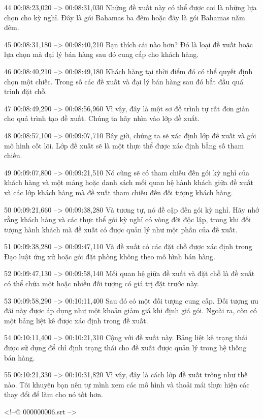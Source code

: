 44
00:08:23,020 --> 00:08:31,030
Những đề xuất này có thể được coi là những lựa chọn cho kỳ nghỉ.  Đây là gói Bahamas ba đêm hoặc đây là gói Bahamas năm đêm.

45
00:08:31,180 --> 00:08:40,210
Bạn thích cái nào hơn?  Đó là loại đề xuất hoặc lựa chọn mà đại lý bán hàng sau đó cung cấp cho khách hàng.

46
00:08:40,210 --> 00:08:49,180
Khách hàng tại thời điểm đó có thể quyết định chọn một chiếc.  Trong số các đề xuất và đại lý bán hàng sau đó bắt đầu quá trình đặt chỗ.

47
00:08:49,290 --> 00:08:56,960
Vì vậy, đây là một sơ đồ trình tự rất đơn giản cho quá trình tạo đề xuất.  Chúng ta hãy nhìn vào lớp đề xuất.

48
00:08:57,100 --> 00:09:07,710
Bây giờ, chúng ta sẽ xác định lớp đề xuất và gói mô hình cốt lõi.  Lớp đề xuất sẽ là một thực thể được xác định bằng số tham chiếu.

49
00:09:07,800 --> 00:09:21,510
Nó cũng sẽ có tham chiếu đến gói kỳ nghỉ của khách hàng và một mảng hoặc danh sách mối quan hệ hành khách giữa đề xuất và các lớp khách hàng mà đề xuất tham chiếu đến đối tượng khách hàng.

50
00:09:21,660 --> 00:09:38,280
Và tương tự, nó đề cập đến gói kỳ nghỉ.  Hãy nhớ rằng khách hàng và các thực thể gói kỳ nghỉ có vòng đời độc lập, trong khi đối tượng hành khách mà đề xuất có được quản lý như một phần của đề xuất.

51
00:09:38,280 --> 00:09:47,110
Và đề xuất có các đặt chỗ được xác định trong Đạo luật ứng xử hoặc gói đặt phòng không theo mô hình bán hàng.

52
00:09:47,130 --> 00:09:58,140
Mối quan hệ giữa đề xuất và đặt chỗ là đề xuất có thể chứa một hoặc nhiều đối tượng có giá trị đặt trước này.

53
00:09:58,290 --> 00:10:11,400
Sau đó có một đối tượng cung cấp.  Đối tượng ưu đãi này được áp dụng như một khoản giảm giá khi định giá gói.  Ngoài ra, còn có một bảng liệt kê được xác định trong đề xuất.

54
00:10:11,400 --> 00:10:21,310
Cộng với đề xuất này.  Bảng liệt kê trạng thái được sử dụng để chỉ định trạng thái cho đề xuất được quản lý trong hệ thống bán hàng.

55
00:10:21,330 --> 00:10:31,820
Vì vậy, đây là cách lớp đề xuất trông như thế nào.  Tôi khuyên bạn nên tự mình xem các mô hình và thoải mái thực hiện các thay đổi để làm cho nó tốt hơn.

<!--@ 000000006.srt -->

